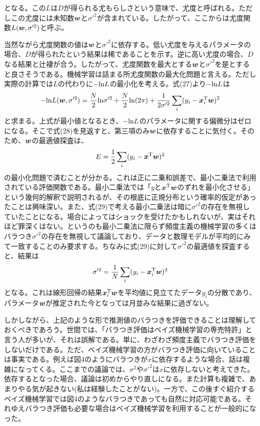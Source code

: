 \documentclass[dvipdfmx, 9pt, a4paper]{jsarticle}
\newcommand{\bm}[1]{{\mbox{\boldmath $#1$}}}
\begin{document}
となる。この$L$は$D$が得られる尤もらしさという意味で、尤度と呼ばれる。ただしこの尤度には未知数$\bm w$と$\sigma'^2$が含まれている。したがって、ここからは尤度関数$L(\bm w, \sigma'^2)$と呼ぶ。\par
当然ながら尤度関数の値は$\bm w$と$\sigma'^2$に依存する。低い尤度を与えるパラメータの場合、$D$が得られたという結果は稀であることを示す。逆に高い尤度の場合、$D$なる結果と辻褄が合う。したがって、尤度関数を最大とする$\bm w$と$\sigma'^2$を是とすると良さそうである。機械学習は詰まる所尤度関数の最大化問題と言える。ただし実際の計算では$L$の代わりに$-{\rm ln}L$の最小化を考える。式(27)より$-{\rm ln}L$は
\begin{equation}
-{\rm ln}L(\bm w, \sigma'^2)=\frac{N}{2}{\rm ln}\sigma'^2+\frac{N}{2}{\rm ln}(2\pi)+\frac{1}{2\sigma'^2}\sum_i (y_i-\bm x_i^{\rm T}\bm w)^2
\end{equation}
と求まる。上式が最小値となるとき、$-{\rm ln}L$のパラメータに関する偏微分はゼロになる。そこで式(28)を見返すと、第三項のみ$\bm w$に依存することに気付く。そのため、$\bm w$の最適値探査は、
\begin{equation}
E=\frac{1}{2}\sum_i (y_i-\bm x^{\rm T}\bm w)^2
\end{equation}
の最小化問題で済むことが分かる。これは正に二乗和誤差で、最小二乗法で利用されている評価関数である。最小二乗法では「$y$と$\bm x^{\rm T}\bm w$のずれを最小化させる」という幾何的解釈で説明されるが、その根底に正規分布という確率的仮定があったことは興味深い。また、式(29)で考える最小二乗法は暗に$\sigma'^2$の存在を無視していたことになる。場合によってはショックを受けたかもしれないが、実はそれほど罪深くはない。というのも最小二乗法に限らず頻度主義の機械学習の多くはバラつき$\sigma'^2$の存在を無視して議論しており、データと数理モデルが平均的にみて一致することのみ要求する。ちなみに式(29)に対して$\sigma'^2$の最適値を探査すると、結果は
\begin{equation}
\sigma'^2=\frac{1}{N}\sum_i (y_i-\bm x_i^{\rm T}\bm w)^2 \notag
\end{equation}
となる。これは線形回帰の結果$\bm x_i^{\rm T}\bm w$を平均値に見立てたデータ$y_i$の分散であり、パラメータ$\bm w$が推定された今となっては月並みな結果に過ぎない。\par
しかしながら、上記のような形で推測値のバラつきを評価できることは理解しておくべきであろう。世間では、「バラつき評価はベイズ機械学習の専売特許」と言う人が多いが、それは誤解である。単に、わざわざ頻度主義でバラつき評価をしないだけである。ただ、ベイズ機械学習の方がバラつき評価に向いていることは事実である。例えば図4のようにバラつきが$x$に依存するような場合、話は複雑になってくる。ここまでの議論では、$\sigma^2$や$\sigma'^2$は$x$に依存しないと考えてきた。依存するとなった場合、議論は初めからやり直しになる。また計算も複雑で、あまりやる気が起きない(私は経験したことがない)。一方で、この後すぐ紹介するベイズ機械学習では図4のようなバラつきであっても自然に対応可能である。それゆえバラつき評価も必要な場合はベイズ機械学習を利用することが一般的になった。\par
\end{document}
